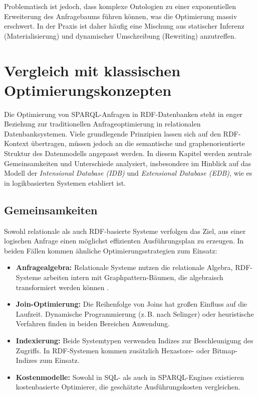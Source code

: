 \documentclass[12pt]{article}
\begin{document}
Problematisch ist jedoch, dass komplexe Ontologien zu einer exponentiellen Erweiterung des Anfragebaums führen können, was die Optimierung massiv erschwert. In der Praxis ist daher häufig eine Mischung aus statischer Inferenz (Materialisierung) und dynamischer Umschreibung (Rewriting) anzutreffen.

\section{Vergleich mit klassischen Optimierungskonzepten} \label{sec:vergleich}

Die Optimierung von SPARQL-Anfragen in RDF-Datenbanken steht in enger Beziehung zur traditionellen Anfrageoptimierung in relationalen Datenbanksystemen. Viele grundlegende Prinzipien lassen sich auf den RDF-Kontext übertragen, müssen jedoch an die semantische und graphenorientierte Struktur des Datenmodells angepasst werden. In diesem Kapitel werden zentrale Gemeinsamkeiten und Unterschiede analysiert, insbesondere im Hinblick auf das Modell der \textit{Intensional Database (IDB)} und \textit{Extensional Database (EDB)}, wie es in logikbasierten Systemen etabliert ist.

\subsection{Gemeinsamkeiten}

Sowohl relationale als auch RDF-basierte Systeme verfolgen das Ziel, aus einer logischen Anfrage einen möglichst effizienten Ausführungsplan zu erzeugen. In beiden Fällen kommen ähnliche Optimierungsstrategien zum Einsatz:

\begin{itemize}
    \item \textbf{Anfragealgebra:} Relationale Systeme nutzen die relationale Algebra, RDF-Systeme arbeiten intern mit Graphpattern-Bäumen, die algebraisch transformiert werden können \cite{perez2009semantics}.
    \item \textbf{Join-Optimierung:} Die Reihenfolge von Joins hat großen Einfluss auf die Laufzeit. Dynamische Programmierung (z.\,B. nach Selinger) oder heuristische Verfahren finden in beiden Bereichen Anwendung.
    \item \textbf{Indexierung:} Beide Systemtypen verwenden Indizes zur Beschleunigung des Zugriffs. In RDF-Systemen kommen zusätzlich Hexastore- oder Bitmap-Indizes zum Einsatz.
    \item \textbf{Kostenmodelle:} Sowohl in SQL- als auch in SPARQL-Engines existieren kostenbasierte Optimierer, die geschätzte Ausführungskosten vergleichen.
\end{itemize}
\end{document}
